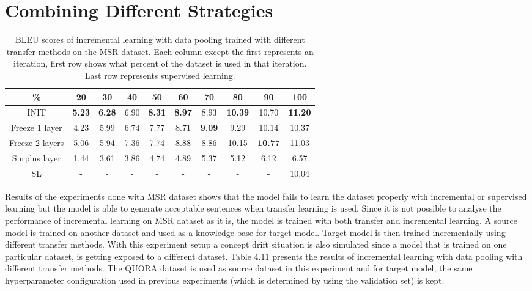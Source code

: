 \section{Combining Different Strategies}

\begin{table}[b]
\centering
\small
 \begin{tabular}{|c | c | c | c | c | c | c | c | c | c |} 
 \hline
 \% & 20 & 30 & 40 & 50 & 60 & 70 & 80 & 90 & 100 \\ [0.5ex] 
 \hline
  INIT & \textbf{5.23} & \textbf{6.28} & 6.90 & \textbf{8.31} & \textbf{8.97} & 8.93 & \textbf{10.39} & 10.70 & \textbf{11.20}  \\ 
 \hline
 Freeze 1 layer & 4.23 & 5.99 & 6.74 & 7.77 & 8.71 & \textbf{9.09} & 9.29 & 10.14 & 10.37 \\ 
 \hline
 Freeze 2 layers & 5.06 & 5.94 & 7.36 & 7.74 & 8.88 & 8.86 & 10.15 & \textbf{10.77} & 11.03 \\ 
  \hline
  Surplus layer & 1.44 & 3.61 & 3.86 & 4.74 & 4.89 & 5.37 & 5.12 & 6.12 & 6.57 \\ 
  \hline
  SL & - & - & - & - & - & - & - & - & 10.04 \\ 
 \hline
\end{tabular}
\caption{BLEU scores of incremental learning with data pooling trained with different transfer methods on the MSR dataset. Each column except the first represents an iteration, first row shows what percent of the dataset is used in that iteration. Last row represents supervised learning.}
\end{table}

Results of the experiments done with MSR dataset shows that the model fails to learn the dataset properly with incremental or supervised learning but the model is able to generate acceptable sentences when transfer learning is used. Since it is not possible to analyse the performance of incremental learning on MSR dataset as it is, the model is trained with both transfer and incremental learning. A source model is trained on another dataset and used as a knowledge base for target model. Target model is then trained incrementally using different transfer methods. With this experiment setup a concept drift situation is also simulated since a model that is trained on one particular dataset, is getting exposed to a different dataset. Table 4.11 presents the results of incremental learning with data pooling with different transfer methods. The QUORA dataset is used as source dataset in this experiment and for target model, the same hyperparameter configuration used in previous experiments (which is determined by using the validation set) is kept.

